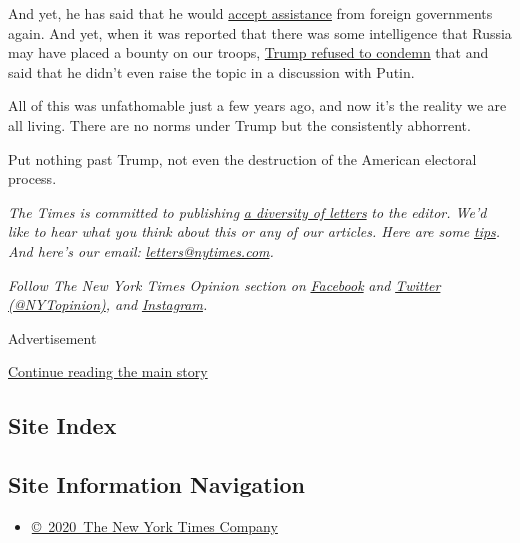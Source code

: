 And yet, he has said that he would
\href{https://abcnews.go.com/Politics/id-exclusive-interview-trump-listen-foreigners-offered-dirt/story?id=63669304}{accept
assistance} from foreign governments again. And yet, when it was
reported that there was some intelligence that Russia may have placed a
bounty on our troops,
\href{https://www.axios.com/trump-russia-bounties-taliban-putin-call-4a0f6110-ab58-41c0-96fc-57b507462af1.html}{Trump
refused to condemn} that and said that he didn't even raise the topic in
a discussion with Putin.

All of this was unfathomable just a few years ago, and now it's the
reality we are all living. There are no norms under Trump but the
consistently abhorrent.

Put nothing past Trump, not even the destruction of the American
electoral process.

\emph{The Times is committed to publishing}
\href{https://www.nytimes.com/2019/01/31/opinion/letters/letters-to-editor-new-york-times-women.html}{\emph{a
diversity of letters}} \emph{to the editor. We'd like to hear what you
think about this or any of our articles. Here are some}
\href{https://help.nytimes.com/hc/en-us/articles/115014925288-How-to-submit-a-letter-to-the-editor}{\emph{tips}}\emph{.
And here's our email:}
\href{mailto:letters@nytimes.com}{\emph{letters@nytimes.com}}\emph{.}

\emph{Follow The New York Times Opinion section on}
\href{https://www.facebook.com/nytopinion}{\emph{Facebook}} \emph{and}
\href{http://twitter.com/NYTOpinion}{\emph{Twitter
(@NYTopinion)}}\emph{, and}
\href{https://www.instagram.com/nytopinion/}{\emph{Instagram}}\emph{.}

Advertisement

\protect\hyperlink{after-bottom}{Continue reading the main story}

\hypertarget{site-index}{%
\subsection{Site Index}\label{site-index}}

\hypertarget{site-information-navigation}{%
\subsection{Site Information
Navigation}\label{site-information-navigation}}

\begin{itemize}
\tightlist
\item
  \href{https://help.nytimes.com/hc/en-us/articles/115014792127-Copyright-notice}{©~2020~The
  New York Times Company}
\end{itemize}


